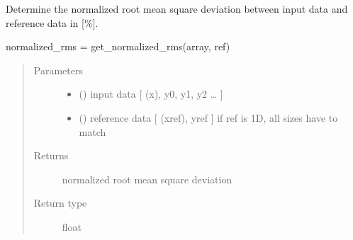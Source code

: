 \documentclass[letterpaper,10pt,english,openany,oneside]{sphinxmanual}
\begin{document}
\begin{fulllineitems}
\label{\detokenize{pygpc:pygpc.misc.get_normalized_rms}}
Determine the normalized root mean square deviation between input data and reference data in {[}\%{]}.

normalized\_rms = get\_normalized\_rms(array, ref)
\begin{quote}\begin{description}
\item[{Parameters}] \leavevmode\begin{itemize}
\item {} 
 () \textendash{} input data {[} (x), y0, y1, y2 … {]}

\item {} 
 () \textendash{} reference data {[} (xref), yref {]}
if ref is 1D, all sizes have to match

\end{itemize}

\item[{Returns}] \leavevmode
{} \textendash{} normalized root mean square deviation

\item[{Return type}] \leavevmode
float

\end{description}\end{quote}

\end{fulllineitems}

\end{document}
